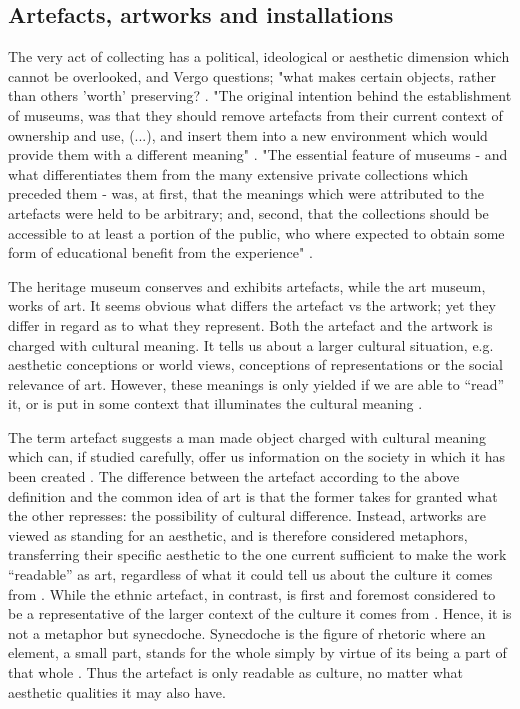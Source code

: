 \subsection{Artefacts, artworks and installations}


The very act of collecting has a political, ideological or aesthetic dimension which cannot be overlooked, and Vergo questions; "what makes certain objects, rather than others 'worth' preserving? \autocite[p. 2]{vergo_museology_1989}. "The original intention behind the establishment of museums, was that they should remove artefacts from their current context of ownership and use, (...), and insert them into a new environment which would provide them with a different meaning" \autocite[p. 6]{vergo_museology_1989}. "The essential feature of museums - and what differentiates them from the many extensive private collections which preceded them - was, at first, that the meanings which were attributed to the artefacts were held to be arbitrary; and, second, that the collections should be accessible to at least a portion of the public, who where expected to obtain some form of educational benefit from the experience" \autocite[p. 6]{vergo_museology_1989}.


The heritage museum conserves and exhibits artefacts, while the art museum, works of art. It seems obvious what differs the artefact vs the artwork; yet they differ in regard as to what they represent. Both the artefact and the artwork is charged with cultural meaning. It tells us about a larger cultural situation, e.g. aesthetic conceptions or world views, conceptions of representations or the social relevance of art. However, these meanings is only yielded if we are able to “read” it, or is put in some context that illuminates the cultural meaning \autocite[p. 206]{Thi_book}.

The term artefact suggests a man made object charged with cultural meaning which can, if studied carefully, offer us information on the society in which it has been created \autocite[p. 205]{Thi_book}. The difference between the artefact according to the above definition and the common idea of art is that the former takes for granted what the other represses: the possibility of cultural difference. Instead, artworks are viewed as standing for an aesthetic, and is therefore considered metaphors, transferring their specific aesthetic to the one current sufficient to make the work “readable” as art, regardless of what it could tell us about the culture it comes from \autocite[p. 206]{Thi_book}. While the ethnic artefact, in contrast, is first and foremost considered to be a representative of the larger context of the culture it comes from \autocite[p. 206]{Thi_book}. Hence, it is not a metaphor but synecdoche. Synecdoche is the figure of rhetoric where an element, a small part, stands for the whole simply by virtue of its being a part of that whole \autocite[p. 206]{Thi_book}. Thus the artefact is only readable as culture, no matter what aesthetic qualities it may also have.

